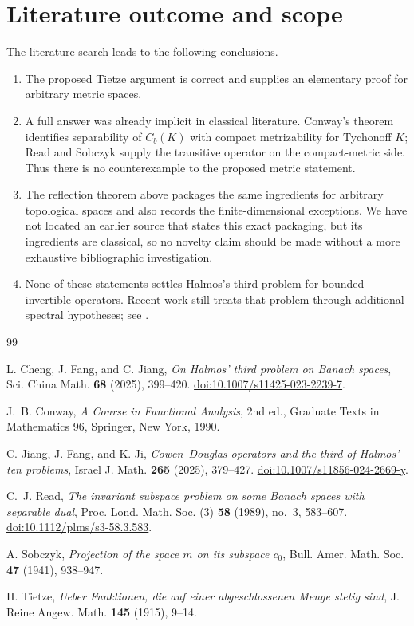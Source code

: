 \documentclass[11pt]{article}
\theoremstyle{remark}
\newcommand{\Cb}{C_b}
\begin{document}
\section{Literature outcome and scope}

The literature search leads to the following conclusions.

\begin{enumerate}[leftmargin=2.2em]
  \item The proposed Tietze argument is correct and supplies an elementary
        proof for arbitrary metric spaces.
  \item A full answer was already implicit in classical literature.  Conway's
        theorem identifies separability of $\Cb(K)$ with compact metrizability
        for Tychonoff $K$; Read and Sobczyk supply the transitive operator on
        the compact-metric side.  Thus there is no counterexample to the
        proposed metric statement.
  \item The reflection theorem above packages the same ingredients for
        arbitrary topological spaces and also records the finite-dimensional
        exceptions.  We have not located an earlier source that states this
        exact packaging, but its ingredients are classical, so no novelty claim
        should be made without a more exhaustive bibliographic investigation.
  \item None of these statements settles Halmos's third problem for bounded
        invertible operators.  Recent work still treats that problem through
        additional spectral hypotheses; see \cite{JFJ}.
\end{enumerate}

\begin{thebibliography}{99}

L. Cheng, J. Fang, and C. Jiang,
\emph{On Halmos' third problem on Banach spaces},
Sci. China Math. \textbf{68} (2025), 399--420.
\href{https://doi.org/10.1007/s11425-023-2239-7}
{doi:10.1007/s11425-023-2239-7}.

J.~B. Conway,
\emph{A Course in Functional Analysis}, 2nd ed.,
Graduate Texts in Mathematics 96, Springer, New York, 1990.

C. Jiang, J. Fang, and K. Ji,
\emph{Cowen--Douglas operators and the third of Halmos' ten problems},
Israel J. Math. \textbf{265} (2025), 379--427.
\href{https://doi.org/10.1007/s11856-024-2669-y}
{doi:10.1007/s11856-024-2669-y}.

C.~J. Read,
\emph{The invariant subspace problem on some Banach spaces with separable
 dual},
Proc. Lond. Math. Soc. (3) \textbf{58} (1989), no.~3, 583--607.
\href{https://doi.org/10.1112/plms/s3-58.3.583}
{doi:10.1112/plms/s3-58.3.583}.

A. Sobczyk,
\emph{Projection of the space $m$ on its subspace $c_0$},
Bull. Amer. Math. Soc. \textbf{47} (1941), 938--947.

H. Tietze,
\emph{Ueber Funktionen, die auf einer abgeschlossenen Menge stetig sind},
J. Reine Angew. Math. \textbf{145} (1915), 9--14.

\end{thebibliography}
\end{document}
